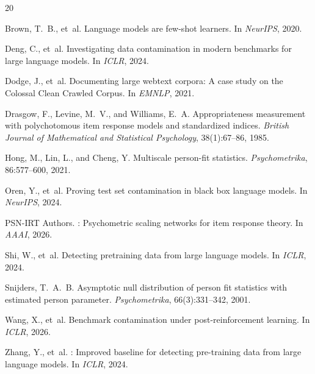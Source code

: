 \documentclass[11pt,a4paper]{article}
\begin{document}

\begin{thebibliography}{20}

Brown, T.~B., et~al.
\newblock Language models are few-shot learners.
\newblock In \emph{NeurIPS}, 2020.

Deng, C., et~al.
\newblock Investigating data contamination in modern benchmarks for large language models.
\newblock In \emph{ICLR}, 2024.

Dodge, J., et~al.
\newblock Documenting large webtext corpora: A case study on the {C}olossal {C}lean {C}rawled {C}orpus.
\newblock In \emph{EMNLP}, 2021.

Drasgow, F., Levine, M.~V., and Williams, E.~A.
\newblock Appropriateness measurement with polychotomous item response models and standardized indices.
\newblock \emph{British Journal of Mathematical and Statistical Psychology}, 38(1):67--86, 1985.

Hong, M., Lin, L., and Cheng, Y.
\newblock Multiscale person-fit statistics.
\newblock \emph{Psychometrika}, 86:577--600, 2021.

Oren, Y., et~al.
\newblock Proving test set contamination in black box language models.
\newblock In \emph{NeurIPS}, 2024.

{PSN-IRT Authors}.
: Psychometric scaling networks for item response theory.
\newblock In \emph{AAAI}, 2026.

Shi, W., et~al.
\newblock Detecting pretraining data from large language models.
\newblock In \emph{ICLR}, 2024.

Snijders, T.~A.~B.
\newblock Asymptotic null distribution of person fit statistics with estimated person parameter.
\newblock \emph{Psychometrika}, 66(3):331--342, 2001.

Wang, X., et~al.
\newblock Benchmark contamination under post-reinforcement learning.
\newblock In \emph{ICLR}, 2026.

Zhang, Y., et~al.
: Improved baseline for detecting pre-training data from large language models.
\newblock In \emph{ICLR}, 2024.


\end{thebibliography}
\end{document}
